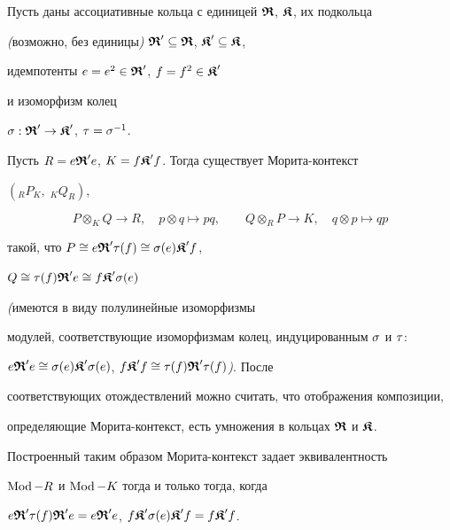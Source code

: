 \begin{lem}


Пусть даны ассоциативные кольца с единицей $\R$, $\K$, их подкольца


{\em (}возможно, без единицы{\em )} $\R'\subseteq \R$, $\K'\subseteq \K$,


идемпотенты $e=e^2\in \R'$, $f=f^2\in \K'$


и изоморфизм колец


$\s : \R' \to \K'$, $\t = \s^{-1}$.


Пусть $R=e\R' e$, $K=f\K' f$. Тогда существует Морита-контекст


$({}_R P_K,\;{}_K Q_R)$,


$$


P \otimes_{K}Q \to R ,\quad p \otimes q \mapsto pq, \qquad


Q \otimes_{R}P \to K ,\quad q \otimes p \mapsto qp


$$


такой, что $P\cong e\R'\t(f) \cong \s(e)\K' f$,


$Q\cong \t(f)\R' e\cong f\K' \s(e) $


{\em (}имеются в виду полулинейные изоморфизмы


модулей, соответствующие изоморфизмам колец, индуцированным $\s$ и $\t$:


$e\R' e\cong \s(e)\K' \s(e)$, $f\K' f \cong \t(f)\R' \t(f)${\em )}. После


соответствующих отождествлений можно считать, что отображения композиции,


определяющие Морита-контекст, есть умножения в кольцах $\R$ и $\K$.


Построенный таким образом Морита-контекст задает эквивалентность


$\Mod-R$ и $\Mod-K$ тогда и только тогда, когда


$ e\R' \t(f) \R' e=e\R'e$, $f\K' \s(e) \K' f=f\K' f$.


\end{lem}





